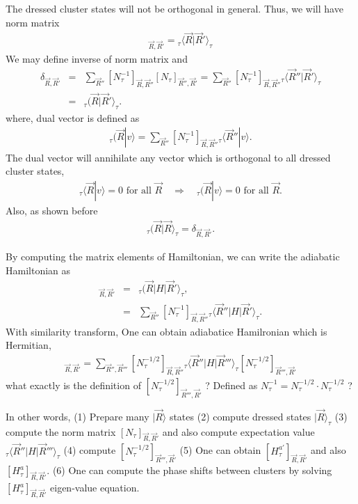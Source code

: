 \documentclass[10pt]{book}
\newcommand{\bea}{\begin{eqnarray}}
\newcommand{\eea}{\end{eqnarray}}
\newcommand{\no}{\nonumber \\}
\def\la{\langle}
\def\ra{\rangle}
\begin{document}
The dressed cluster states will not be orthogonal in general. Thus, we will have 
norm matrix 
\bea
[N_\tau]_{ {\vec R}, {\vec R}'} ={}_\tau\la {\vec R}|{\vec R}'\ra_\tau 
\eea 
We may define inverse of norm matrix and 
\bea 
\delta_{{\vec R},{\vec R}'} &=& \sum_{{\vec R}''}  [N_\tau^{-1}]_{ {\vec R}, {\vec R}''}[N_\tau]_{ {\vec R}'', {\vec R}'}
 =\sum_{\vec R''}   [N_\tau^{-1}]_{ {\vec R}, {\vec R}''}
   {}_\tau\la {\vec R}''|{\vec R}'\ra_\tau \no 
  &=& {}_\tau( {\vec R}| {\vec R}'\ra_\tau.
\eea 
where, dual vector is defined as
\bea 
{}_\tau( {\vec R}|v\ra  =\sum_{\vec R''}   [N_\tau^{-1}]_{ {\vec R}, {\vec R}''}
{}_\tau\la {\vec R}''| v\ra. 
\eea 
The dual vector will annihilate any vector which is orthogonal to all dressed cluster states,
\bea 
{}_\tau\la {\vec R}|v\ra=0 \mbox{ for all }{\vec R} \quad \Rightarrow \quad 
{}_\tau( {\vec R}|v\ra=0 \mbox{ for all }{\vec R} .
\eea 
Also, as shown before 
\bea 
{}_\tau ({\vec R} | {\vec R}\ra_\tau=\delta_{{\vec R},{\vec R}'}.
\eea 

By computing the matrix elements of Hamiltonian, we can write the 
adiabatic Hamiltonian as
\bea 
[H^a_\tau]_{{\vec R},{\vec R}'}&=&{}_\tau({\vec R}| H|{\vec R}'\ra_\tau,\no 
        &=& \sum_{\vec R''} [N_\tau^{-1}]_{{\vec R},{\vec R}''} 
          {}_\tau\la {\vec R}''| H |{\vec R}'\ra_\tau . 
\eea 
With similarity transform, One can obtain adiabatice Hamilronian 
which is Hermitian,
\bea 
[H^{a'}_\tau]_{{\vec R},{\vec R}'}
=\sum_{ {\vec R}'',{\vec R}'''} \left[ N_\tau^{-1/2}\right]_{{\vec R},{\vec R}'' }
        {}_\tau\la {\vec R}''|H|{\vec R}'''\ra_\tau 
       \left[ N_\tau^{-1/2}\right]_{{\vec R}''',{\vec R}'}                            
\eea 
{\color{red} what exactly is the definition of $\left[ N_\tau^{-1/2}\right]_{{\vec R}''',{\vec R}'}$ ?  Defined as  $N_\tau^{-1}=N_\tau^{-1/2} \cdot N_\tau^{-1/2}$ ? } 

In other words, (1) Prepare many $|{\vec R}\ra$ states (2) compute dressed states $|{\vec R}\ra_\tau$
(3) compute the norm matrix $[N_\tau]_{{\vec R},{\vec R}'}$ and also compute expectation value 
${}_\tau\la {\vec R}''|H|{\vec R}'''\ra_\tau$ (4) compute $\left[ N_\tau^{-1/2}\right]_{{\vec R}''',{\vec R}'}$
(5) One can obtain $[H_\tau^{a'}]_{{\vec R},{\vec R}'}$ and also $[H_\tau^{a}]_{{\vec R},{\vec R}'}$. 
(6) One can compute the phase shifts between clusters by solving $[H_\tau^{a}]_{{\vec R},{\vec R}'}$ eigen-value 
equation. 
\end{document}

